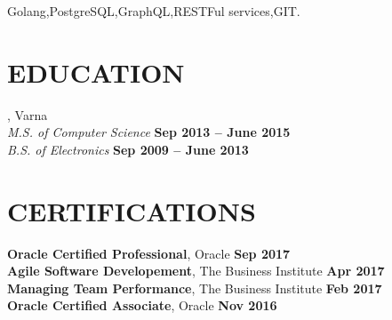\documentclass[margin,line]{resume}
\begin{document}
\begin{resume}
    Golang,\hspace{2mm}PostgreSQL,\hspace{2mm}GraphQL,\hspace{2mm}RESTFul services,\hspace{2mm}GIT.\@

\sectionline%

    \section{\mysidestyle\textbf{\large{E}\small{DUCATION}}}

    \textbf{}, Varna \vspace{2mm}\\\vspace{1mm}%
    \textsl{M.S. of Computer Science} \hfill \textbf{ Sep 2013 {--} June 2015}\\
    \textsl{B.S. of Electronics} \hfill \textbf{ Sep 2009 {--} June 2013}\\

\sectionline%

    \section{\mysidestyle\textbf{\large{C}\small{ERTIFICATIONS}}}

    \textbf{Oracle Certified Professional}, Oracle \hfill \textbf{Sep 2017} \vspace{2mm}\\\vspace{1mm}%
    \textbf{Agile Software Developement}, The Business Institute \hfill \textbf{Apr 2017} \vspace{2mm}\\\vspace{1mm}%
    \textbf{Managing Team Performance}, The Business Institute \hfill \textbf{Feb 2017} \vspace{2mm}\\\vspace{1mm}%
    \textbf{Oracle Certified Associate}, Oracle \hfill \textbf{Nov 2016} \vspace{2mm}\\\vspace{1mm}%

\end{resume}
\end{document}
